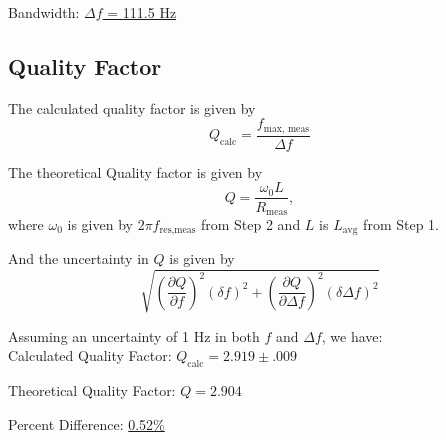 \documentclass[twocolumn,english]{IEEEtran}
\theoremstyle{plain}
\theoremstyle{plain}
\begin{document}
Bandwidth: \hfill\underline{$\Delta f$ = 111.5 Hz}

\hrulefill

\subsection{Quality Factor}
The calculated quality factor is given by
\begin{equation}
	Q_{\text{calc}} = \frac{f_{\text{max, meas}}}{\Delta f}
\end{equation}

The theoretical Quality factor is given by
\begin{equation}
	Q = \frac{\omega_0 L}{R_{\text{meas}}},
\end{equation}
where $\omega_0$ is given by $2\pi f_{\text{res,meas}}$ from Step 2 and $L$ is $L_{\text{avg}}$ from Step 1.

And the uncertainty in $Q$ is given by
\begin{equation}
	\sqrt{(\frac{\partial Q}{\partial f})^2(\delta f)^2 + (\frac{\partial Q}{\partial \Delta f})^2(\delta \Delta f)^2}
\end{equation}

Assuming an uncertainty of 1 Hz in both $f$ and $\Delta f$, we have: \\


\hfill Calculated Quality Factor: \underline{$Q_{\text{calc}} = 2.919\pm .009$}

\hfill Theoretical Quality Factor: \underline{$Q = 2.904$}

\hfill Percent Difference: \underline{0.52\%}

\hrulefill

%
%
\end{document}
